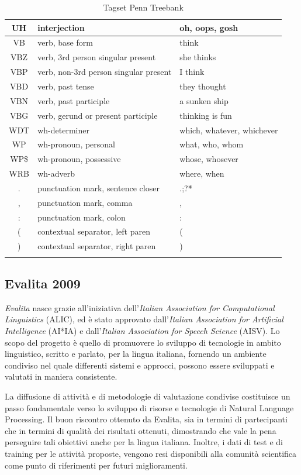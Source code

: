 \begin{longtable}{| c | p{} | p{} |}
  UH & interjection & oh, oops, gosh  \\ \hline
  VB & verb, base form & think  \\ \hline
  VBZ & verb, 3rd person singular present & she thinks  \\ \hline
  VBP & verb, non-3rd person singular present & I think  \\ \hline
  VBD & verb, past tense & they thought  \\ \hline
  VBN & verb, past participle & a sunken ship  \\ \hline
  VBG & verb, gerund or present participle & thinking is fun  \\ \hline
  WDT & wh-determiner & which, whatever, whichever  \\ \hline
  WP & wh-pronoun, personal & what, who, whom  \\ \hline
  WP\$ & wh-pronoun, possessive & whose, whosever  \\ \hline
  WRB & wh-adverb & where, when  \\ \hline
  . & punctuation mark, sentence closer & .;?*  \\ \hline
  , & punctuation mark, comma & ,  \\ \hline
  : & punctuation mark, colon & :  \\ \hline
  ( & contextual separator, left paren & (  \\ \hline
  ) & contextual separator, right paren & ) \\ \hline
  \caption{Tagset Penn Treebank} \label{tab:penn-tagset}
\end{longtable}

\subsection{Evalita 2009}
\emph{Evalita} nasce grazie all'iniziativa dell'\emph{Italian Association for
Computational Linguistics} (ALIC), ed \`e stato approvato dall'\emph{Italian
Association for Artificial Intelligence} (AI*IA) e dall'\emph{Italian Association
for Speech Science} (AISV). Lo scopo del progetto \`e quello di promuovere lo sviluppo
di tecnologie in ambito linguistico, scritto e parlato, per la lingua italiana,
fornendo un ambiente condiviso nel quale differenti sistemi e approcci, possono
essere sviluppati e valutati in maniera consistente.

La diffusione di attivit\`a e di metodologie di valutazione condivise costituisce
un passo fondamentale verso lo sviluppo di risorse e tecnologie di Natural Language
Processing. Il buon riscontro ottenuto da Evalita, sia in termini di partecipanti
che in termini di qualit\`a dei risultati ottenuti, dimostrando che vale la pena
perseguire tali obiettivi anche per la lingua italiana. Inoltre, i dati di test
e di training per le attivit\`a proposte, vengono resi disponibili alla comunit\`a
scientifica come punto di riferimenti per futuri miglioramenti.

